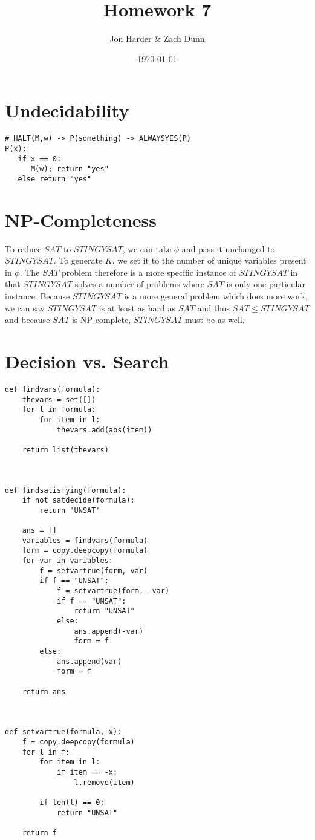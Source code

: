 \documentclass[11pt, letterpaper]{article}
\author{Jon Harder \& Zach Dunn}
\date{\today}
\title{Homework 7}
\begin{document}
\maketitle
\section{Undecidability}

\begin{verbatim}
# HALT(M,w) -> P(something) -> ALWAYSYES(P)
P(x):
   if x == 0:
      M(w); return "yes"
   else return "yes"
\end{verbatim}


\section{NP-Completeness}
To reduce $SAT$ to $STINGYSAT$, we can take $\phi$ and pass it unchanged to $STINGYSAT$.  To
generate $K$, we set it to the number of unique variables present in $\phi$. The $SAT$ problem
therefore is a more specific instance of $STINGYSAT$ in that $STINGYSAT$ solves a number of problems
where $SAT$ is only one particular instance.  Because $STINGYSAT$ is a more general problem which
does more work, we can say $STINGYSAT$ is at least as hard as $SAT$ and thus $SAT \leq STINGYSAT$
and because $SAT$ is NP-complete, $STINGYSAT$ must be as well.\\

\section{Decision vs. Search}
\begin{verbatim}
def findvars(formula):
    thevars = set([])
    for l in formula:
        for item in l:
            thevars.add(abs(item))

    return list(thevars)



def findsatisfying(formula):
    if not satdecide(formula):
        return 'UNSAT'

    ans = []
    variables = findvars(formula)
    form = copy.deepcopy(formula)
    for var in variables:
        f = setvartrue(form, var)
        if f == "UNSAT":
            f = setvartrue(form, -var)
            if f == "UNSAT":
                return "UNSAT"
            else:
                ans.append(-var)
                form = f
        else:
            ans.append(var)
            form = f

    return ans



def setvartrue(formula, x):
    f = copy.deepcopy(formula)
    for l in f:
        for item in l:
            if item == -x:
                l.remove(item)

        if len(l) == 0:
            return "UNSAT"

    return f
\end{verbatim}
\end{document}
